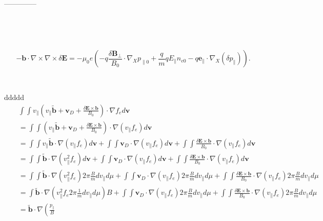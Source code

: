 \documentclass{article}
\begin{document}
\

--------------

\

\


\begin{equation}
  -\mathbf{b} \cdot \nabla \times \nabla \times \delta \mathbf{E}= - \mu_0 e
  \left( - q \frac{\delta \mathbf{B}_{\perp}}{B_0} \cdot \nabla_X p_{\parallel
  0} + \frac{q}{m} q E_{\parallel} n_{e 0} - q\mathbf{e}_{\parallel} \cdot
  \nabla_X (\delta p_{\parallel}) \right) .
\end{equation}


\

ddddd
\begin{eqnarray*}
  &  & \int \int v_{\parallel} \left( v_{\parallel} \tilde{\mathbf{b}}
  +\mathbf{v}_D + \frac{\delta \mathbf{E} \times \mathbf{b}}{B_0} \right)
  \cdot \nabla f_e d\mathbf{v}\\
  &  & = \int \int \left( v_{\parallel} \tilde{\mathbf{b}} +\mathbf{v}_D +
  \frac{\delta \mathbf{E} \times \mathbf{b}}{B_0} \right) \cdot \nabla
  (v_{\parallel} f_e) d\mathbf{v}\\
  &  & = \int \int v_{\parallel} \tilde{\mathbf{b}} \cdot \nabla
  (v_{\parallel} f_e) d\mathbf{v}+ \int \int \mathbf{v}_D \cdot \nabla
  (v_{\parallel} f_e) d\mathbf{v}+ \int \int \frac{\delta \mathbf{E} \times
  \mathbf{b}}{B_0} \cdot \nabla (v_{\parallel} f_e) d\mathbf{v}\\
  &  & = \int \int \tilde{\mathbf{b}} \cdot \nabla (v_{\parallel}^2 f_e)
  d\mathbf{v}+ \int \int \mathbf{v}_D \cdot \nabla (v_{\parallel} f_e)
  d\mathbf{v}+ \int \int \frac{\delta \mathbf{E} \times \mathbf{b}}{B_0} \cdot
  \nabla (v_{\parallel} f_e) d\mathbf{v}\\
  &  & = \int \int \tilde{\mathbf{b}} \cdot \nabla (v_{\parallel}^2 f_e) 2
  \pi \frac{B}{m} d v_{\parallel} d \mu + \int \int \mathbf{v}_D \cdot \nabla
  (v_{\parallel} f_e) 2 \pi \frac{B}{m} d v_{\parallel} d \mu + \int \int
  \frac{\delta \mathbf{E} \times \mathbf{b}}{B_0} \cdot \nabla (v_{\parallel}
  f_e) 2 \pi \frac{B}{m} d v_{\parallel} d \mu\\
  &  & = \int \tilde{\mathbf{b}} \cdot \nabla \left( v_{\parallel}^2 f_e 2
  \pi \frac{1}{m} d v_{\parallel} d \mu \right) B + \int \int \mathbf{v}_D
  \cdot \nabla (v_{\parallel} f_e) 2 \pi \frac{B}{m} d v_{\parallel} d \mu +
  \int \int \frac{\delta \mathbf{E} \times \mathbf{b}}{B_0} \cdot \nabla
  (v_{\parallel} f_e) 2 \pi \frac{B}{m} d v_{\parallel} d \mu\\
  &  & = \tilde{\mathbf{b}} \cdot \nabla \left( \frac{p_{\parallel}}{B}

\end{eqnarray*}
\end{document}
